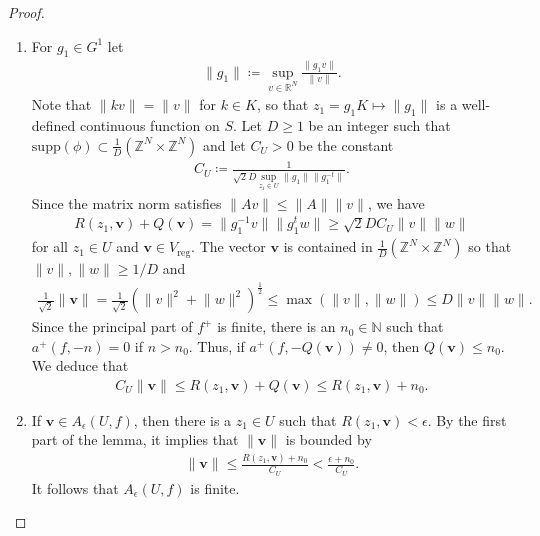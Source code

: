 \documentclass[twoside,a4paper,10pt]{article} %
\newcommand{\8}{\infty}
\newcommand{\Z}{\mathbb{Z}}
\newcommand{\NN}{\mathbb{N}}
\newcommand{\vbf}{\mathbf{v}}
\newcommand{\R}{\mathbb{R}}
\newcommand{\reg}{\mathrm{reg}}
\newcommand{\supp}{\mathrm{supp}}
\theoremstyle{mytheoremstyle}
\theoremstyle{remark}
\numberwithin{equation}{section}
\begin{document}
\begin{proof} \begin{enumerate} \item For $g_1 \in G^1$ let 
\begin{align}
\lVert g_1 \rVert \coloneqq \sup_{v \in \R^N} \frac{\lVert g_1v \rVert}{\lVert v \rVert}.
\end{align} Note that $\lVert kv \rVert=\lVert v \rVert$ for $k \in K$, so that $z_1=g_1 K \longmapsto \lVert g_1 \rVert$ is a well-defined continuous function on $S$. Let $D \geq 1$ be an integer such that $\supp(\phi) \subset \frac{1}{D} (\Z^N \times \Z^N)$ and let $C_U>0$ be the constant
\begin{align}
C_U \coloneqq \frac{1}{\sqrt{2}D \sup_{z_1 \in U} \lVert g_1 \rVert \lVert g_1^{-t} \rVert}.
\end{align}
Since the matrix norm satisfies $\lVert A v \rVert \leq \lVert A \rVert \lVert v \rVert$, we have
\begin{align}
R(z_1,\vbf)+Q(\vbf)=\lVert g_1^{-1}v \rVert \lVert g_1^tw \rVert \geq \sqrt{2}D C_U \lVert v \rVert\lVert w \rVert
\end{align} for all $z_1 \in U$ and $\vbf \in V_\reg$. The vector $\vbf$ is contained in $\frac{1}{D} (\Z^N \times \Z^N)$ so that $\lVert v \rVert,\lVert w \rVert \geq 1/D$ and
\begin{align}
 \frac{1}{\sqrt{2}} \lVert \vbf \rVert = \frac{1}{\sqrt{2}} \left (\lVert v \rVert^2+\lVert w \rVert^2 \right )^{\frac{1}{2}} \leq \max(\lVert v \rVert,\lVert w \rVert) \leq D \lVert v \rVert\lVert w \rVert.
\end{align}
Since the principal part of $f^+$ is finite, there is an $n_0 \in \NN$ such that $a^+(f,-n)=0$ if $n > n_0$. Thus, if $a^+(f,-Q(\vbf)) \neq 0$, then $Q(\vbf) \leq n_0$. We deduce that
\begin{align} \label{step in Lemma}
C_U\lVert \vbf \rVert \leq R(z_1,\vbf)+Q(\vbf) \leq R(z_1,\vbf)+n_0.
\end{align}

\item  If $\vbf \in A_\epsilon(U,f)$, then there is a $z_1 \in U$ such that $R(z_1,\vbf)<\epsilon$. By the first part of the lemma, it implies that $\lVert \vbf \rVert$ is bounded by
\begin{align}
\lVert \vbf \rVert \leq \frac{R(z_1,\vbf)+n_0}{C_U} < \frac{\epsilon+n_0}{C_U}.
\end{align} It follows that $A_\epsilon(U,f)$ is finite. 


\end{enumerate}
\end{proof}
\end{document}
